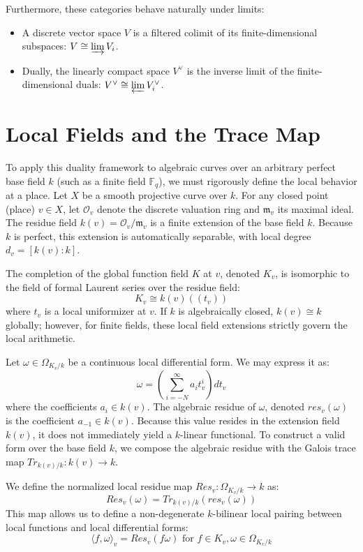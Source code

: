 \documentclass[12pt]{article}
\begin{document}
Furthermore, these categories behave naturally under limits:
\begin{itemize}
    \item A discrete vector space $V$ is a filtered colimit of its finite-dimensional subspaces: $V\cong \varinjlim V_{i}$.
    \item Dually, the linearly compact space $V^{\vee}$ is the inverse limit of the finite-dimensional duals: $V^{\vee}\cong \varprojlim V_{i}^{\vee}$.
\end{itemize}

\section{Local Fields and the Trace Map}

To apply this duality framework to algebraic curves over an arbitrary perfect base field $k$ (such as a finite field $\mathbb{F}_{q}$), we must rigorously define the local behavior at a place. Let $X$ be a smooth projective curve over $k$. For any closed point (place) $v\in X$, let $\mathcal{O}_{v}$ denote the discrete valuation ring and $\mathfrak{m}_{v}$ its maximal ideal. The residue field $k(v)=\mathcal{O}_{v}/\mathfrak{m}_{v}$ is a finite extension of the base field $k$. Because $k$ is perfect, this extension is automatically separable, with local degree $d_{v}=[k(v):k]$.

The completion of the global function field $K$ at $v$, denoted $K_{v}$, is isomorphic to the field of formal Laurent series over the residue field:
$$K_{v}\cong k(v)((t_{v}))$$
where $t_{v}$ is a local uniformizer at $v$. If $k$ is algebraically closed, $k(v)\cong k$ globally; however, for finite fields, these local field extensions strictly govern the local arithmetic.

Let $\omega\in\Omega_{K_{v}/k}$ be a continuous local differential form. We may express it as:
$$\omega=\left(\sum_{i=-N}^{\infty}a_{i}t_{v}^{i}\right)dt_{v}$$
where the coefficients $a_{i}\in k(v)$. The algebraic residue of $\omega$, denoted $res_{v}(\omega)$ is the coefficient $a_{-1}\in k(v)$. Because this value resides in the extension field $k(v)$, it does not immediately yield a $k$-linear functional. To construct a valid form over the base field $k$, we compose the algebraic residue with the Galois trace map $Tr_{k(v)/k}:k(v)\rightarrow k$.

We define the normalized local residue map $Res_{v}:\Omega_{K_{v}/k}\rightarrow k$ as:
$$Res_{v}(\omega)=Tr_{k(v)/k}(res_{v}(\omega))$$
This map allows us to define a non-degenerate $k$-bilinear local pairing between local functions and local differential forms:
$$\langle f,\omega\rangle_{v}=Res_{v}(f\omega) \text{ for } f\in K_{v}, \omega\in\Omega_{K_{v}/k}$$
\end{document}

